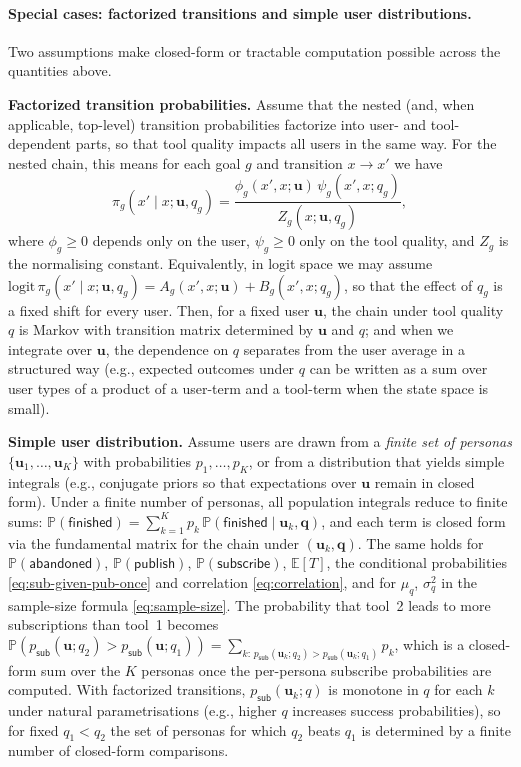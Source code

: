 \paragraph{Special cases: factorized transitions and simple user distributions.}
Two assumptions make closed-form or tractable computation possible across the quantities above.

\textbf{Factorized transition probabilities.} Assume that the nested (and, when applicable, top-level) transition probabilities factorize into user- and tool-dependent parts, so that tool quality impacts all users in the same way. For the nested chain, this means for each goal $g$ and transition $x \to x'$ we have
\begin{equation}
  \pi_g(x' \mid x; \mathbf{u}, q_g) = \frac{\phi_g(x', x; \mathbf{u})\, \psi_g(x', x; q_g)}{Z_g(x; \mathbf{u}, q_g)}, \label{eq:factorize}
\end{equation}
where $\phi_g \geq 0$ depends only on the user, $\psi_g \geq 0$ only on the tool quality, and $Z_g$ is the normalising constant. Equivalently, in logit space we may assume $\mathrm{logit}\,\pi_g(x' \mid x; \mathbf{u}, q_g) = A_g(x', x; \mathbf{u}) + B_g(x', x; q_g)$, so that the effect of $q_g$ is a fixed shift for every user. Then, for a fixed user $\mathbf{u}$, the chain under tool quality $q$ is Markov with transition matrix determined by $\mathbf{u}$ and $q$; and when we integrate over $\mathbf{u}$, the dependence on $q$ separates from the user average in a structured way (e.g., expected outcomes under $q$ can be written as a sum over user types of a product of a user-term and a tool-term when the state space is small).

\textbf{Simple user distribution.} Assume users are drawn from a \emph{finite set of personas} $\{\mathbf{u}_1, \ldots, \mathbf{u}_K\}$ with probabilities $p_1, \ldots, p_K$, or from a distribution that yields simple integrals (e.g., conjugate priors so that expectations over $\mathbf{u}$ remain in closed form). Under a finite number of personas, all population integrals reduce to finite sums: $\mathbb{P}(\mathsf{finished}) = \sum_{k=1}^K p_k\, \mathbb{P}(\mathsf{finished} \mid \mathbf{u}_k, \mathbf{q})$, and each term is closed form via the fundamental matrix for the chain under $(\mathbf{u}_k, \mathbf{q})$. The same holds for $\mathbb{P}(\mathsf{abandoned})$, $\mathbb{P}(\mathsf{publish})$, $\mathbb{P}(\mathsf{subscribe})$, $\mathbb{E}[T]$, the conditional probabilities \eqref{eq:sub-given-pub-once} and correlation \eqref{eq:correlation}, and for $\mu_q$, $\sigma_q^2$ in the sample-size formula \eqref{eq:sample-size}. The probability that tool~2 leads to more subscriptions than tool~1 becomes $\mathbb{P}(p_{\mathsf{sub}}(\mathbf{u}; q_2) > p_{\mathsf{sub}}(\mathbf{u}; q_1)) = \sum_{k:\, p_{\mathsf{sub}}(\mathbf{u}_k; q_2) > p_{\mathsf{sub}}(\mathbf{u}_k; q_1)} p_k$, which is a closed-form sum over the $K$ personas once the per-persona subscribe probabilities are computed. With factorized transitions, $p_{\mathsf{sub}}(\mathbf{u}_k; q)$ is monotone in $q$ for each $k$ under natural parametrisations (e.g., higher $q$ increases success probabilities), so for fixed $q_1 < q_2$ the set of personas for which $q_2$ beats $q_1$ is determined by a finite number of closed-form comparisons.

